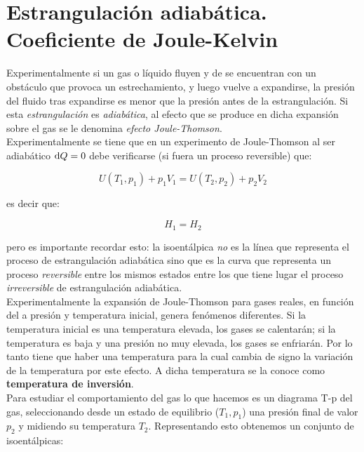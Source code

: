 \documentclass[12pt,a4paper,oneside]{book}
\begin{document}
\section{Estrangulación adiabática. Coeficiente de Joule-Kelvin}

Experimentalmente si un gas o líquido fluyen y de se encuentran con un obstáculo que provoca un estrechamiento, y luego vuelve a expandirse, la presión del fluido tras expandirse es menor que la presión antes de la estrangulación. Si esta \textit{estrangulación} es \textit{adiabática}, al efecto que se produce en dicha expansión sobre el gas se le denomina \textit{efecto Joule-Thomson}. \\

Experimentalmente se tiene que en un experimento de Joule-Thomson al ser adiabático $\mathrm{d} Q=0$ debe verificarse (si fuera un proceso reversible) que:

\begin{equation}
U(T_1,p_1) + p_1 V_1 = U(T_2,p_2) + p_2 V_2
\end{equation}

es decir que:

\begin{equation}
H_1 = H_2
\end{equation}

pero es importante recordar esto: la isoentálpica \textit{no} es la línea que representa el proceso de estrangulación adiabática sino que es la curva que representa un proceso \textit{reversible} entre los mismos estados entre los que tiene lugar el proceso \textit{irreversible} de estrangulación adiabática. \\

Experimentalmente la expansión de Joule-Thomson para gases reales, en función del a presión y temperatura inicial, genera fenómenos diferentes. Si la temperatura inicial es una temperatura elevada, los gases se calentarán; si la temperatura es baja y una presión no muy elevada, los gases se enfriarán. Por lo tanto tiene que haber una temperatura para la cual cambia de signo la variación de la temperatura por este efecto. A dicha temperatura se la conoce como \textbf{temperatura de inversión}.\\

Para estudiar el comportamiento del gas lo que hacemos es un diagrama T-p del gas, seleccionando desde un estado de equilibrio ($T_1,p_1$) una presión final de valor $p_2$ y midiendo su temperatura $T_2$. Representando esto obtenemos un conjunto de isoentálpicas:
\end{document}
